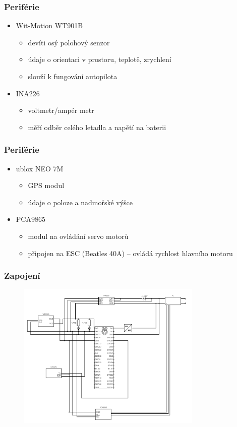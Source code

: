 \documentclass[aspectratio=43]{beamer}
\begin{document}
\begin{frame}[fragile]
	\frametitle{Periférie}
	\begin{itemize}
		\item Wit-Motion WT901B
			\begin{itemize}
				\item devíti osý polohový senzor
				\item údaje o orientaci v prostoru, teplotě, zrychlení
				\item slouží k fungování autopilota
			\end{itemize}
		\item INA226
			\begin{itemize}
				\item voltmetr/ampér metr
				\item měří odběr celého letadla a napětí na baterii
			\end{itemize}
	\end{itemize}
\end{frame}

\begin{frame}[fragile]
	\frametitle{Periférie}
	\begin{itemize}
		\item ublox NEO 7M
			\begin{itemize}
				\item GPS modul
				\item údaje o poloze a nadmořské výšce
			\end{itemize}
		\item PCA9865
			\begin{itemize}
				\item modul na ovládání servo motorů
				\item připojen na ESC (Beatles 40A) -- ovládá rychlost hlavního motoru
			\end{itemize}
	\end{itemize}
\end{frame}

\begin{frame}[fragile]
	\frametitle{Zapojení}
	\begin{figure}[h]
		\centering
		\includegraphics[height=7cm]{./../img/schema.png}
	\end{figure}
\end{frame}
\end{document}
